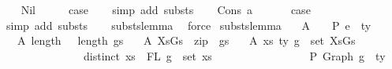 \begin{isabellebody}
\ \ \isamarkupfalse%
\ Nil\isanewline
\ \ \isamarkupfalse%
\ \isamarkupfalse%
\ {\isacharquery}{\kern0pt}case\isanewline
\ \ \isamarkupfalse%
\ {\isacharparenleft}{\kern0pt}simp\ add{\isacharcolon}{\kern0pt}\ substs{\isacharparenright}{\kern0pt}\isanewline
{}\isamarkupfalse%
\isanewline
\ \ \isamarkupfalse%
\ {\isacharparenleft}{\kern0pt}Cons\ a\ {\isasymGamma}{\isacharparenright}{\kern0pt}\isanewline
\ \ \isamarkupfalse%
\ \isamarkupfalse%
\ {\isacharquery}{\kern0pt}case\isanewline
\ \ \isamarkupfalse%
\ {\isacharparenleft}{\kern0pt}simp\ add{\isacharcolon}{\kern0pt}\ substs{\isacharparenright}{\kern0pt}\isanewline
\ \ \isamarkupfalse%
\ substs{\isacharunderscore}{\kern0pt}lemma{}\ \isamarkupfalse%
\ force\isanewline
{}\isamarkupfalse%
%
\endisatagproof
{\isafoldproof}%
%
\isadelimproof
\isanewline
%
\endisadelimproof
\isanewline
\isanewline
{}\isamarkupfalse%
\ substs{\isacharunderscore}{\kern0pt}lemma{\isacharcolon}{\kern0pt}\isanewline
\ \ \ A{}{\isacharcolon}{\kern0pt}\ {\isachardoublequoteopen}{\isasymGamma}\ {\isacharat}{\kern0pt}\ {\isasymGamma}{}\ {\isasymturnstile}{\isacharbraceleft}{\kern0pt}P{\isacharbraceright}{\kern0pt}\ e{}\ {\isacharcolon}{\kern0pt}\ ty{}{\isachardoublequoteclose}\isanewline
\ \ \ A{}{\isacharcolon}{\kern0pt}\ {\isachardoublequoteopen}length\ {\isasymGamma}\ {\isacharequal}{\kern0pt}\ length\ gs{\isachardoublequoteclose}\isanewline
\ \ \ A{}{\isacharcolon}{\kern0pt}\ {\isachardoublequoteopen}XsGs\ {\isacharequal}{\kern0pt}\ zip\ {\isasymGamma}\ gs{\isachardoublequoteclose}\isanewline
\ \ \ A{}{\isacharcolon}{\kern0pt}\ {\isachardoublequoteopen}{\isasymforall}{\isacharparenleft}{\kern0pt}{\isacharparenleft}{\kern0pt}xs{\isacharcomma}{\kern0pt}\ ty{\isacharparenright}{\kern0pt}{\isacharcomma}{\kern0pt}\ g{\isacharparenright}{\kern0pt}\ {\isasymin}\ set\ XsGs{\isachardot}{\kern0pt}\ {\isacharparenleft}{\kern0pt}\isanewline
\ \ \ \ \ \ \ \ \ \ \ \ \ \ \ distinct\ xs\ {\isasymand}\ FL\ g\ {\isacharequal}{\kern0pt}\ set\ xs\ {\isasymand}\isanewline
\ \ \ \ \ \ \ \ \ \ \ \ \ \ \ {\isacharbrackleft}{\kern0pt}{\isacharbrackright}{\kern0pt}\ {\isasymturnstile}{\isacharbraceleft}{\kern0pt}P{\isacharbraceright}{\kern0pt}\ Graph\ g\ {\isacharcolon}{\kern0pt}\ ty{\isacharparenright}{\kern0pt}{\isachardoublequoteclose}\isanewline

\end{isabellebody}
